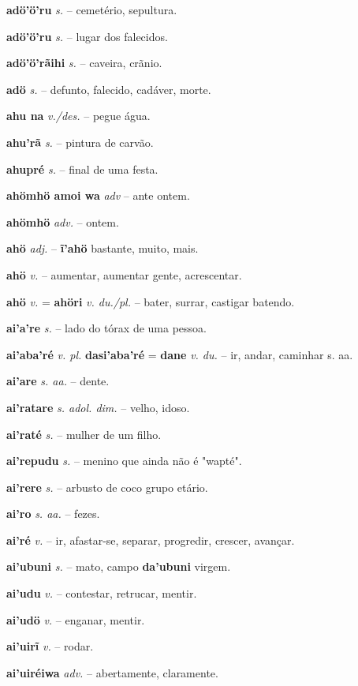\textbf{adö'ö'ru} \textit{s.} -- cemetério, sepultura.

\textbf{adö'ö'ru} \textit{s.} -- lugar dos falecidos.

\textbf{adö'ö'rãihi} \textit{s.} -- caveira, crãnio.

\textbf{adö} \textit{s.} -- defunto, falecido, cadáver, morte.

\textbf{ahu na} \textit{v./des.} -- pegue água.

\textbf{ahu'rã} \textit{s.} -- pintura de carvão.

\textbf{ahupré} \textit{s.} -- final de uma festa.

\textbf{ahömhö amoi wa} \textit{adv} -- ante ontem.

\textbf{ahömhö} \textit{adv.} -- ontem.

\textbf{ahö} \textit{adj.} -- \textbf{ĩ'ahö} bastante, muito, mais.

\textbf{ahö} \textit{v.} -- aumentar, aumentar gente, acrescentar.

\textbf{ahö} \textit{v.} = \textbf{ahöri} \textit{v. du./pl.} -- bater, surrar, castigar batendo.

\textbf{ai'a're} \textit{s.} -- lado do tórax de uma pessoa.

\textbf{ai'aba'ré} \textit{v. pl.} \textbf{dasi'aba'ré} = \textbf{dane} \textit{v. du.} -- ir, andar, caminhar s. aa.

\textbf{ai'are} \textit{ s. aa.} -- dente.

\textbf{ai'ratare} \textit{s. adol. dim.} -- velho, idoso.

\textbf{ai'raté} \textit{s.} -- mulher de um filho.

\textbf{ai'repudu} \textit{s.} -- menino que ainda não é "wapté".

\textbf{ai'rere} \textit{s.} -- arbusto de coco  grupo etário.

\textbf{ai'ro} \textit{s. aa.} -- fezes.

\textbf{ai'ré} \textit{v.} -- ir, afastar-se, separar, progredir, crescer, avançar.

\textbf{ai'ubuni} \textit{s.} -- mato, campo  \textbf{da'ubuni} virgem.

\textbf{ai'udu} \textit{v.} -- contestar, retrucar, mentir.

\textbf{ai'udö} \textit{v.} -- enganar, mentir.

\textbf{ai'uirĩ} \textit{v.} -- rodar.

\textbf{ai'uiréiwa} \textit{adv.} -- abertamente, claramente.

